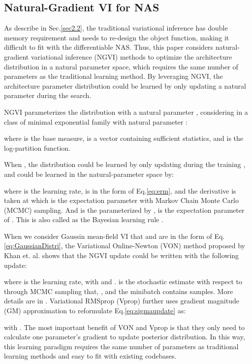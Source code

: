 \documentclass[10pt,twocolumn,letterpaper]{article}
\begin{document}
\subsection{Natural-Gradient VI for NAS}
\label{sec3.2}

As describe in Sec.\ref{sec2.2}, the traditional variational inference has double memory requirement and needs to re-design the object function, making it difficult to fit with the differentiable NAS. Thus, this paper considers natural-gradient variational inference (NGVI) methods \cite{khan2018fast,osawa2019practical} to optimize the architecture distribution  in a natural parameter space, which requires the same number of parameters as the traditional learning method. By leveraging NGVI, the architecture parameter distribution could be learned by only updating a natural parameter  during the search. 


NGVI parameterizes the distribution  with a natural parameter , considering  in a class of minimal exponential family with natural parameter  \cite{khan2017conjugate}:

where  is the base measure,  is a vector containing sufficient statistics, and  is the log-partition function. 


When , the distribution  could be learned by only updating  during the training \cite{khan2018fast,khan2020}, and  could be learned in the natural-parameter space by:

where  is the learning rate,  is in the form of Eq.\eqref{eq:erm}, and the derivative  is taken at  which is the expectation parameter with Markov Chain Monte Carlo (MCMC) sampling. And  is the  parameterized by ,  is the expectation parameter of . This is also called as the Bayesian learning rule \cite{khan2020}.



When we consider Gaussin mean-field VI that  and  are in the form of Eq.\eqref{eq:GaussianDistri}, the Variational Online-Newton (VON) method proposed by Khan et. al. \cite{khan2018fast} shows that the NGVI update could be written with the following update:


where  is the learning rate,  with  and .  is the stochastic estimate with respect to  through MCMC sampling that, , and the minibatch  contains  samples. More details are in \cite{khan2018fast}. Variational RMSprop (Vprop) \cite{khan2018fast} further uses gradient magnitude (GM) \cite{bottou2018optimization} approximation to reformulate Eq.\eqref{eq:sigmaupdate} as:

with  \cite{bottou2018optimization}. The most important benefit of VON and Vprop is that they only need to calculate one parameter's gradient to update posterior distribution. In this way, this learning paradigm requires the same number of parameters as traditional learning methods and easy to fit with existing codebases. 
\end{document}
